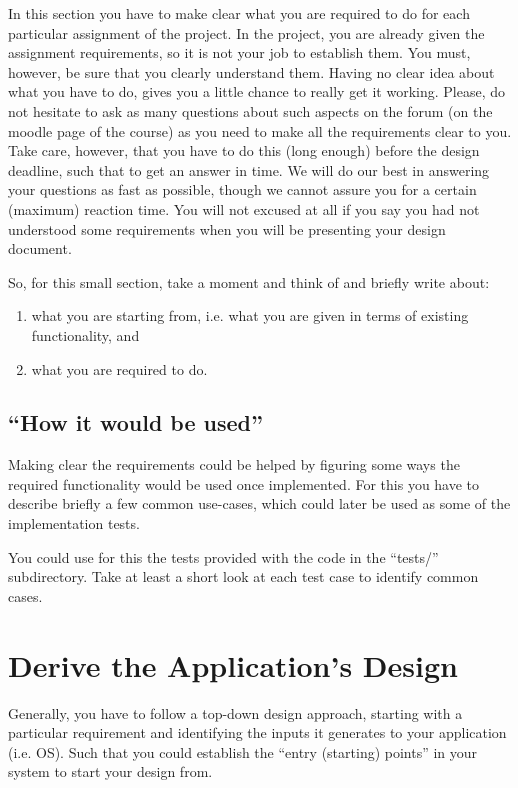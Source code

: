 In this section you have to make clear what you are required to do for each particular assignment of the \OSName{} project. In the \OSName{} project, you are already given the assignment requirements, so it is not your job to establish them. You must, however, be sure that you clearly understand them. Having no clear idea about what you have to do, gives you a little chance to really get it working. Please, do not hesitate to ask as many questions about such aspects on the \OSName{} forum (on the moodle page of the course) as you need to make all the requirements clear to you. Take care, however, that you have to do this (long enough) before the design deadline, such that to get an answer in time. We will do our best in answering your questions as fast as possible, though we cannot assure you for a certain (maximum) reaction time. You will not excused at all if you say you had not understood some requirements when you will be presenting your design document.

So, for this small section, take a moment and think of and briefly write about: 
\begin{enumerate}
    \item what you are starting from, i.e. what you are given in terms of \OSName{} existing functionality, and
    \item what you are required to do.
\end{enumerate}


\subsection{``How it would be used''}

Making clear the requirements could be helped by figuring some ways the required functionality would be used once implemented. 
For this you have to describe briefly a few common use-cases, which could later be used as some of the implementation tests. 

You could use for this the tests provided with the \OSName{} code in the ``tests/'' subdirectory. Take at least a short look at each test case to identify common cases.


\section{Derive the Application's Design}

Generally, you have to follow a top-down design approach, starting with a particular requirement and identifying the inputs it generates to your application (i.e. \OSName{} OS). Such that you could establish the ``entry (starting) points'' in your system to start your design from. 

